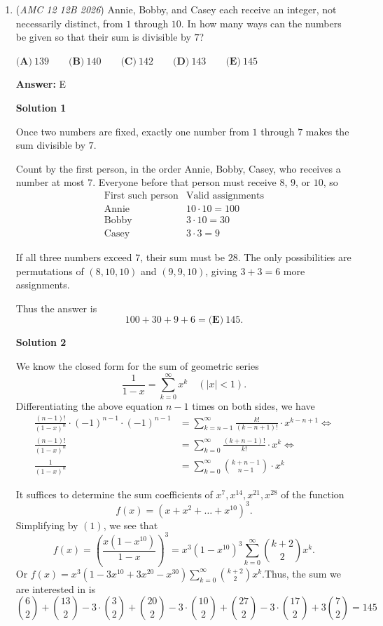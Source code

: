 \begin{enumerate}
 \textbf{=Youtube Short by STML} 


	\item (\textit{AMC 12 12B 2026}) Annie, Bobby, and Casey each receive an integer, not necessarily distinct, from $1$ through $10$. In how many ways can the numbers be given so that their sum is divisible by $7$?


 $\textbf{(A)}\   139  \qquad                  \textbf{(B)}\   140  \qquad                 \textbf{(C)}\   142  \qquad                 \textbf{(D)}\   143  \qquad                 \textbf{(E)}\   145$

 \textbf{Answer: }E



\textbf{Solution 1}

Once two numbers are fixed, exactly one number from $1$ through $7$ makes the sum divisible by $7$.

 Count by the first person, in the order Annie, Bobby, Casey, who receives a number at most $7$. Everyone before that person must receive $8$, $9$, or $10$, so
 \[\begin{array}{c|c} \text{First such person}&\text{Valid assignments}\\ \hline \text{Annie}&10\cdot10=100\\ \text{Bobby}&3\cdot10=30\\ \text{Casey}&3\cdot3=9 \end{array}\]

 If all three numbers exceed $7$, their sum must be $28$. The only possibilities are permutations of $(8,10,10)$ and $(9,9,10)$, giving $3+3=6$ more assignments.

 Thus the answer is
 \[100+30+9+6=\boxed{\textbf{(E)}\ 145}.\]




\textbf{Solution 2}

We know the closed form for the sum of geometric series
 \[\frac{1}{1-x}=\sum_{k=0}^\infty x^k\quad (\lvert x\rvert < 1).\]Differentiating the above equation $n-1$ times on both sides, we have\begin{align*}\frac{(n-1)!}{(1-x)^n}\cdot(-1)^{n-1}\cdot(-1)^{n-1}&=\sum_{k=n-1}^\infty\frac{k!}{(k-n+1)!}\cdot x^{k-n+1}\iff\\\frac{(n-1)!}{(1-x)^n}&=\sum_{k=0}^\infty\frac{(k+n-1)!}{k!}\cdot x^k\iff\\\frac{1}{(1-x)^n}&=\sum_{k=0}^\infty\binom{k+n-1}{n-1}\cdot x^k\tag{1}\end{align*}


 It suffices to determine the sum coefficients of $x^7, x^{14}, x^{21}, x^{28}$ of the function
 \[f(x)=(x+x^2+\ldots+x^{10})^3.\]Simplifying by $(1)$, we see that
 \[f(x)=\left(\frac{x(1-x^{10})}{1-x}\right)^3=x^3(1-x^{10})^3\sum_{k=0}^\infty\binom{k+2}{2}x^k.\]Or $f(x)=x^3(1-3x^{10}+3x^{20}-x^{30})\sum_{k=0}^\infty\binom{k+2}{2}x^k$.Thus, the sum we are interested in is 
 \[\binom{6}{2}+\binom{13}{2}-3\cdot\binom{3}{2}+\binom{20}{2}-3\cdot\binom{10}{2}+\binom{27}{2}-3\cdot\binom{17}{2}+3\binom{7}{2}=\boxed{145}\]





\end{enumerate}
